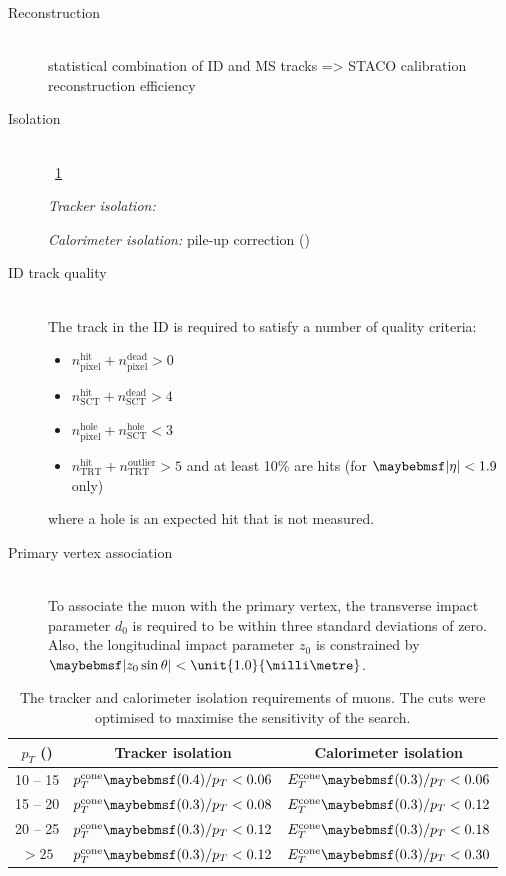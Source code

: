 \begin{description}
\item[Reconstruction] \hfill \\
	statistical combination of ID and MS tracks => STACO
	calibration
	reconstruction efficiency
\item[Isolation] \hfill \\
	\Table~\ref{tab:objects:mu_iso}

	\textit{Tracker isolation:}

	\textit{Calorimeter isolation:} pile-up correction (\npv)
\item[\ac{ID} track quality] \hfill \\
	The track in the \ac{ID} is required to satisfy a number of quality criteria:
	\begin{itemize}
		\item $n_{\text{pixel}}^{\text{hit}} + n_{\text{pixel}}^{\text{dead}} > 0$
		\item $n_{\text{SCT}}^{\text{hit}} + n_{\text{SCT}}^{\text{dead}} > 4$
		\item $n_{\text{pixel}}^{\text{hole}} + n_{\text{SCT}}^{\text{hole}} < 3$
		\item $n_{\text{TRT}}^{\text{hit}} + n_{\text{TRT}}^{\text{outlier}} > 5$ and at 
		least 10\% are hits (for $\mods{\eta} < 1.9$ only)
	\end{itemize}
	where a hole is an expected hit that is not measured.
\item[Primary vertex association] \hfill \\
	To associate the muon with the primary vertex, the transverse impact parameter $d_0$ 
	is required to be within three standard deviations of zero. Also, the longitudinal 
	impact parameter $z_0$ is constrained by $\mods{z_0 \sin\theta} < 
	\unit{1.0}{\milli\metre}$.
\end{description}

\begin{table}[h]
	\begin{tabular}{c@{\hskip 0.3in}c@{\hskip 0.3in}c}
		$p_T$ (\GeV) & Tracker isolation & Calorimeter isolation \\
		\hline
		10 -- 15 & $p_T^{\text{cone}}\parenths{0.4}/p_T < 0.06$ & $E_T^{\text{cone}}\parenths{0.3}/p_T < 0.06$ \\
		15 -- 20 & $p_T^{\text{cone}}\parenths{0.3}/p_T < 0.08$ & $E_T^{\text{cone}}\parenths{0.3}/p_T < 0.12$ \\
		20 -- 25 & $p_T^{\text{cone}}\parenths{0.3}/p_T < 0.12$ & $E_T^{\text{cone}}\parenths{0.3}/p_T < 0.18$ \\
		$> 25$   & $p_T^{\text{cone}}\parenths{0.3}/p_T < 0.12$ & $E_T^{\text{cone}}\parenths{0.3}/p_T < 0.30$ \\
	\end{tabular}
	\caption{The tracker and calorimeter isolation requirements of muons. The cuts were 
	optimised to maximise the sensitivity of the \HWWlvlv search.}
	\label{tab:objects:mu_iso}
\end{table}

